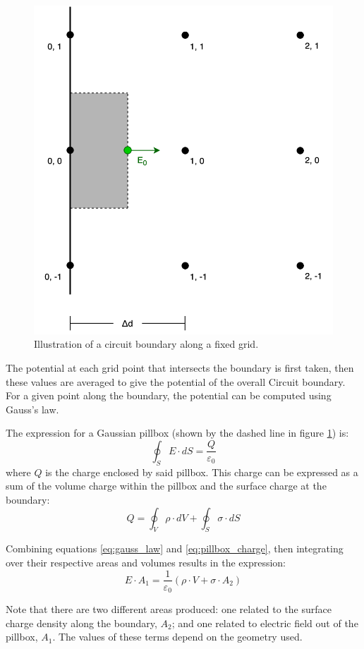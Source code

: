 \begin{figure}[h!]
	\centering
	\includegraphics[width=0.6\linewidth]{xoopic/figures/circuit_general_case.png}
	\caption{Illustration of a circuit boundary along a fixed grid.}
	\label{fig:circuit_general_case}
\end{figure} 

The potential at each grid point that intersects the boundary is first taken, then these values are averaged to give the potential of the overall Circuit boundary. For a given point along the boundary, the potential can be computed using Gauss's law. 

The expression for a Gaussian pillbox (shown by the dashed line in figure \ref{fig:circuit_general_case}) is:
\begin{equation}
	\oint_S E \cdot dS = \frac{Q}{\varepsilon_0}
	\label{eq:gauss_law}
\end{equation}
where $Q$ is the charge enclosed by said pillbox. This charge can be expressed as a sum of the volume charge within the pillbox and the surface charge at the boundary:
\begin{equation}
	Q = \oint_V \rho \cdot dV + \oint_S \sigma \cdot dS
	\label{eq:pillbox_charge}
\end{equation}

Combining equations \ref{eq:gauss_law} and \ref{eq:pillbox_charge}, then integrating over their respective areas and volumes results in the expression:
\begin{equation}
	E \cdot A_1 = \frac{1}{\varepsilon_0}(\rho \cdot V + \sigma \cdot A_2)
	\label{eq:gauss_pillbox}
\end{equation}

Note that there are two different areas produced: one related to the surface charge density along the boundary, $A_2$; and one related to electric field out of the pillbox, $A_1$. The values of these terms depend on the geometry used.

